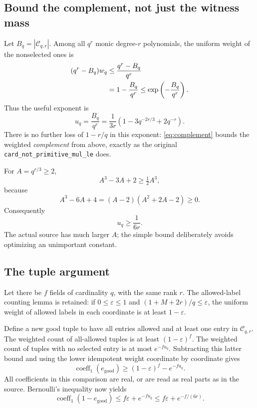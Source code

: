 \documentclass[11pt,a4paper]{article}
\theoremstyle{definition}
\theoremstyle{remark}
\newcommand{\labels}{\mathcal C}
\newcommand{\code}[1]{{\small\nolinkurl{#1}}}
\begin{document}
\subsection{Bound the complement, not just the witness mass}

Let \(B_q=|\labels_{q,r}|\). Among all \(q^r\) monic degree-\(r\) polynomials,
the uniform weight of the nonselected ones is
\begin{align}
    (q^r-B_q)w_q
       &\le \frac{q^r-B_q}{q^r}\notag\\
       &=1-\frac{B_q}{q^r}
        \le \exp\left(-\frac{B_q}{q^r}\right).
        \label{eq:complement}
\end{align}
Thus the useful exponent is
\begin{equation}
       u_q=\frac{B_q}{q^r}
          =\frac{1}{3r}
             \left(1-3q^{-2r/3}+2q^{-r}\right).
       \label{eq:uexact}
\end{equation}
There is no further loss of \(1-r/q\) in this exponent:
\eqref{eq:complement} bounds the weighted \emph{complement} from above,
exactly as the original \code{card_not_primitive_mul_le} does.

For \(A=q^{r/3}\ge2\),
\[
     A^3-3A+2\ge\tfrac12 A^3,
\]
because
\[
     A^3-6A+4=(A-2)(A^2+2A-2)\ge0.
\]
Consequently
\begin{equation}
                         u_q\ge\frac{1}{6r}.
                         \label{eq:usimple}
\end{equation}
The actual source has much larger \(A\); the simple bound deliberately
avoids optimizing an unimportant constant.

\subsection{The tuple argument}

Let there be \(f\) fields of cardinality \(q\), with the same rank \(r\).
The allowed-label counting lemma is retained:
if \(0\le\varepsilon\le1\) and
\((1+M+2r)/q\le\varepsilon\), the uniform weight of allowed labels in each
coordinate is at least \(1-\varepsilon\).

Define a new good tuple to have all entries allowed and at least one entry in
\(\labels_{q,r}\). The weighted count of all-allowed tuples is at least
\((1-\varepsilon)^f\). The weighted count of tuples with no selected entry is
at most \(e^{-fu_q}\). Subtracting this latter bound and using the lower
idempotent weight coordinate by coordinate gives
\[
        \operatorname{coeff}_1(e_{\mathrm{good}})
                 \ge(1-\varepsilon)^f-e^{-fu_q}.
\]
All coefficients in this comparison are real, or are read as real parts as in
the source. Bernoulli's inequality now yields
\begin{equation}
       \operatorname{coeff}_1(1-e_{\mathrm{good}})
          \le f\varepsilon+e^{-fu_q}
          \le f\varepsilon+e^{-f/(6r)}.
       \label{eq:bad}
\end{equation}
\end{document}
